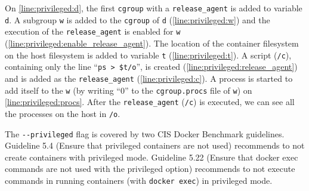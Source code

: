On \autoref{line:privileged:d}, the first \lstinline{cgroup} with a \lstinline{release_agent} is added to variable \lstinline{d}. A subgroup \lstinline{w} is added to the \lstinline{cgroup} of \lstinline{d} (\autoref{line:privileged:w}) and the execution of the \lstinline{release_agent} is enabled for \lstinline{w} (\autoref{line:privileged:enable_release_agent}). The location of the container filesystem on the host filesystem is added to variable \lstinline{t} (\autoref{line:privileged:t}). A script (\lstinline{/c}), containing only the line ``\lstinline{ps > $t/o}'', is created (\autoref{line:privileged:release_agent}) and is added as the \lstinline{release_agent} (\autoref{line:privileged:c}). A process is started to add itself to the \lstinline{w} (by writing ``0'' to the \lstinline{cgroup.procs} file of \lstinline{w}) on \autoref{line:privileged:procs}. After the \lstinline{release_agent} (\lstinline{/c}) is executed, we can see all the processes on the host in \lstinline{/o}.

\medskip

The \lstinline{--privileged} flag is covered by two CIS Docker Benchmark guidelines. Guideline 5.4 (Ensure that privileged containers are not used) recommends to not create containers with privileged mode. Guideline 5.22 (Ensure that docker exec commands are not used with the privileged option) recommends to not execute commands in running containers (with \lstinline{docker exec}) in privileged mode.
